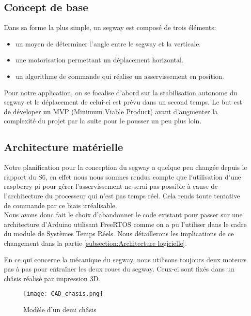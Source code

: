 \documentclass[oneside,a4paper,12pt]{article}
\begin{document}
	\subsection{Concept de base}
	
	Dans sa forme la plus simple, un segway est composé de trois éléments:
	
	\begin{itemize}
		\item un moyen de déterminer l'angle entre le segway et la verticale.
		\item une motorisation permettant un déplacement horizontal.
		\item un algorithme de commande qui réalise un asservissement en position. 
	\end{itemize}

	Pour notre application, on se focalise d'abord sur la stabilisation autonome du segway et le déplacement de celui-ci est prévu dans un second temps. Le but est de déveloper un MVP (Minimum Viable Product) avant d'augmenter la complexité du projet par la suite pour le pousser un peu plus loin.
	
	\subsection{Architecture matérielle}
	\label{Architecture matérielle}
	
	Notre planification pour la conception du segway a quelque peu changée depuis le rapport du S6, en effet nous nous sommes rendus compte que l'utilisation d'une raspberry pi pour gérer l'asservissement ne serai pas possible à cause de l'architecture du processeur qui n'est pas temps réel. Cela rends toute tentative de commande par ce biais irréalisable.\\
	Nous avons donc fait le choix d'abandonner le code existant pour passer sur une architecture d'Arduino utilisant FreeRTOS comme on a pu l'utiliser dans le cadre du module de Systèmes Temps Réels. Nous détaillerons les implications de ce changement dans la partie  \ref{subsection:Architecture logicielle}.
	
	En ce qui concerne la mécanique du segway, nous utilisons toujours deux moteurs pas à pas pour entraîner les deux roues du segway. Ceux-ci sont fixés dans un châsis réalisé par impression 3D.
	
	\newpage
	
	\begin{figure}[h]
		\centering
		\texttt{[image: CAD\_chasis.png]}
		\caption{Modèle d'un  demi châsis}
	\end{figure}
\end{document}
